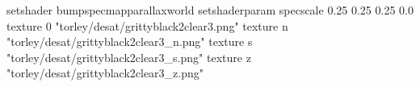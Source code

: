 setshader bumpspecmapparallaxworld
setshaderparam specscale 0.25 0.25 0.25 0.0
texture 0 "torley/desat/grittyblack2clear3.png"
texture n "torley/desat/grittyblack2clear3_n.png"
texture s "torley/desat/grittyblack2clear3_s.png"
texture z "torley/desat/grittyblack2clear3_z.png"

